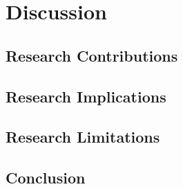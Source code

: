 %
\chapter{Discussion}
\label{sec:discussion}

\section{Research Contributions}

\section{Research Implications}

\section{Research Limitations}

\section{Conclusion}